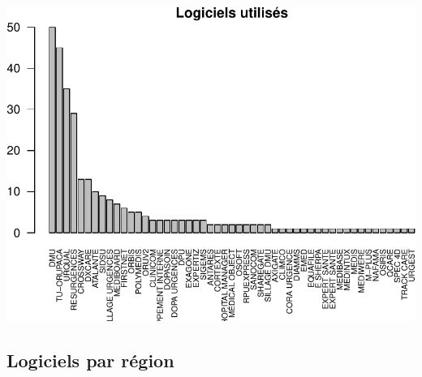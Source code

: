 \documentclass[]{article}
\begin{document}
\includegraphics{septembre2015_files/figure-latex/unnamed-chunk-4-1.pdf}

\subsection{Logiciels par région}\label{logiciels-par-region}
\end{document}
